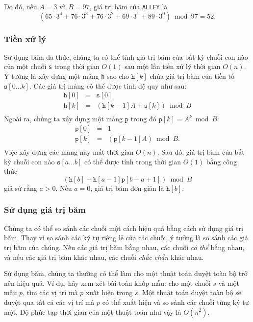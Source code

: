 Do đó, nếu $A=3$ và $B=97$, giá trị băm
của \texttt{ALLEY} là
\[(65 \cdot 3^4 + 76 \cdot 3^3 + 76 \cdot 3^2 + 69 \cdot 3^1 + 89 \cdot 3^0) \bmod 97 = 52.\]

\subsubsection*{Tiền xử lý}

Sử dụng băm đa thức, chúng ta có thể tính giá trị băm của bất kỳ chuỗi con nào
của một chuỗi \texttt{s} trong thời gian $O(1)$ sau một lần tiền xử lý thời gian $O(n)$.
Ý tưởng là xây dựng một mảng \texttt{h} sao cho
$\texttt{h}[k]$ chứa giá trị băm của tiền tố $\texttt{s}[0 \ldots k]$.
Các giá trị mảng có thể được tính đệ quy như sau:
\[
\begin{array}{lcl}
\texttt{h}[0] & = & \texttt{s}[0] \\
\texttt{h}[k] & = & (\texttt{h}[k-1] A + \texttt{s}[k]) \bmod B \\
\end{array}
\]
Ngoài ra, chúng ta xây dựng một mảng $\texttt{p}$
trong đó $\texttt{p}[k]=A^k \bmod B$:
\[
\begin{array}{lcl}
\texttt{p}[0] & = & 1 \\
\texttt{p}[k] & = & (\texttt{p}[k-1] A) \bmod B. \\
\end{array}
\]
Việc xây dựng các mảng này mất thời gian $O(n)$.
Sau đó, giá trị băm của bất kỳ chuỗi con nào
$\texttt{s}[a \ldots b]$
có thể được tính trong thời gian $O(1)$ bằng công thức
\[(\texttt{h}[b]-\texttt{h}[a-1] \texttt{p}[b-a+1]) \bmod B\]
giả sử rằng $a>0$.
Nếu $a=0$, giá trị băm đơn giản là $\texttt{h}[b]$.

\subsubsection*{Sử dụng giá trị băm}

Chúng ta có thể so sánh các chuỗi một cách hiệu quả bằng cách sử dụng giá trị băm.
Thay vì so sánh các ký tự riêng lẻ của các chuỗi,
ý tưởng là so sánh các giá trị băm của chúng.
Nếu các giá trị băm bằng nhau,
các chuỗi \emph{có thể} bằng nhau,
và nếu các giá trị băm khác nhau,
các chuỗi \emph{chắc chắn} khác nhau.

Sử dụng băm, chúng ta thường có thể làm cho một thuật toán
duyệt toàn bộ trở nên hiệu quả.
Ví dụ, hãy xem xét bài toán khớp mẫu:
cho một chuỗi $s$ và một mẫu $p$,
tìm các vị trí mà $p$ xuất hiện trong $s$.
Một thuật toán duyệt toàn bộ sẽ duyệt qua tất cả các vị trí
mà $p$ có thể xuất hiện và so sánh các chuỗi
từng ký tự một.
Độ phức tạp thời gian của một thuật toán như vậy là $O(n^2)$.

